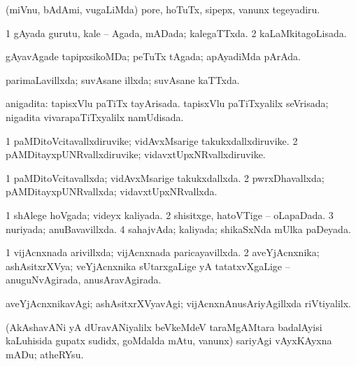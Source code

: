 {{\bentry
{} 
\gl{\sakirx}
\expl{}
\bmng
(miVnu, bAdAmi, \mo vugaLiMda) pore, hoTuTx, sipepx, \mo vanunx tegeyadiru. 
\emng
\eentry

\bentry
{} 
\gl{\gu}
\expl{}
\bmng
\bnum
\num{1} gAyada gurutu, kale -- Agada, mADada; kalegaTTxda. 
\num{2} kaLaMkitagoLisada. 
\enum
\emng
\eentry

\bentry
{} 
\gl{\gu}
\expl{}
\bmng
gAyavAgade tapipxsikoMDa; peTuTx tAgada; apAyadiMda pArAda. 
\emng
\eentry

\bentry
{} 
\gl{\gu}
\expl{}
\bmng
parimaLavillxda; suvAsane illxda; suvAsane kaTTxda. 
\emng
\eentry

\bentry
{} 
\gl{\gu}
\expl{}
\bmng
anigadita: 
\banum
{} tapisxVlu paTiTx tayArisada. 
 tapisxVlu paTiTxyalilx seVrisada; nigadita vivarapaTiTxyalilx namUdisada. 
\eanum
\emng
\eentry

\bentry
{} 
\gl{\nA}
\expl{}
\bmng
\bnum
\num{1} paMDitoVcitavallxdiruvike; vidAvxMsarige takukxdallxdiruvike. 
\num{2} pAMDitayxpUNRvallxdiruvike; vidavxtUpxNRvallxdiruvike. 
\enum
\emng
\eentry

\bentry
{} 
 \gl{\gu} \bmng
\bnum
\num{1} paMDitoVcitavallxda; vidAvxMsarige takukxdallxda. 
\num{2} pwrxDhavallxda; pAMDitayxpUNRvallxda; vidavxtUpxNRvallxda. 
\enum
\emng
\eentry

\bentry
{} 
\gl{\gu}
\expl{}
\bmng
\bnum
\num{1} shAlege hoVgada; videyx kaliyada. 
\num{2} shisitxge, hatoVTige -- oLapaDada. 
\num{3} nuriyada; anuBavavillxda. 
\num{4} sahajvAda; kaliyada; shikaSxNda mUlka paDeyada. 
\enum
\emng
\eentry

\bentry
{} 
\gl{\gu}
\expl{}
\bmng
\bnum
\num{1} vijAcnxnada arivillxda; vijAcnxnada paricayavillxda. 
\num{2} aveYjAcnxnika; ashAsitxrXVya; veYjAcnxnika sUtarxgaLige yA tatatxvXgaLige -- anuguNvAgirada, anusAravAgirada. 
\enum
\emng
\eentry

\bentry
{} 
\gl{\kirxvi}
\expl{}
\bmng
aveYjAcnxnikavAgi; ashAsitxrXVyavAgi; vijAcnxnAnusAriyAgillxda riVtiyalilx. 
\emng
\eentry

\bentry
{} 
\gl{\sakirx}
\expl{}
\bmng
(AkAshavANi yA dUravANiyalilx beVkeMdeV taraMgAMtara badalAyisi kaLuhisida gupatx sudidx, goMdalda mAtu, \mo vanunx) sariyAgi vAyxKAyxna mADu; atheRYsu. 
\emng
\eentry

}}
